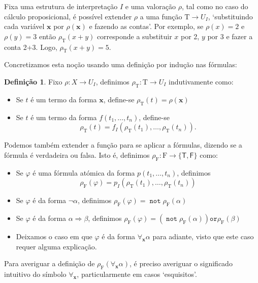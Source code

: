 \documentclass{report}
\theoremstyle{definition}
\newtheorem{definicao}{Definição}
\theoremstyle{remark}
\renewcommand{\bf}[1]{\mathbf{#1}}
\newcommand{\F}{\mathrm{F}}
\newcommand{\T}{\mathrm{T}}
\newcommand{\lt}{\mathsf{T}}
\newcommand{\lf}{\mathsf{F}}
\DeclareMathOperator{\pnot}{\texttt{not}}
\newcommand{\por}{\mathbin{\texttt{or}}}
\newcommand{\imply}{\mathbin{\Rightarrow}}
\begin{document}
	Fixa uma estrutura de interpretação $I$ e uma valoração $\rho$, tal como no caso do cálculo proposicional, é possível extender $\rho$ a uma função $\T \to U_I$, `substituindo cada variável $\bf x$ por $\rho(\bf x)$ e fazendo as contas'. Por exemplo, se $\rho(x) = 2$ e $\rho(y) = 3$ então $\rho_\T(x+y)$ corresponde a substituir $x$ por 2, $y$ por 3 e fazer a conta 2+3. Logo, $\rho_\T(x+y) = 5$.

Concretizamos esta noção usando uma definição por indução nas fórmulas:
	
	\begin{definicao}
	Fixo $\rho : X \to U_I$, definimos $\rho_\T : \T \to U_I$ indutivamente como:
	
	\begin{itemize}
	\item Se $t$ é um termo da forma $\bf x$, define-se $\rho_\T(t) = \rho(\bf x)$
	
	\item Se $t$ é um termo da forma $f(t_1, \dots, t_n)$, define-se
	\[\rho_\T(t) = f_I(\rho_\T(t_1), \dots, \rho_\T(t_n)).\]
	\end{itemize}
	
	Podemos também extender a função para se aplicar a fórmulas, dizendo se a fórmula é verdadeira ou falsa. Isto é, definimos $\rho_\F : \F \to \{\lt, \lf\}$ como:
	
	\begin{itemize}
	\item Se $\varphi$ é uma fórmula atómica da forma $p(t_1, \dots, t_n)$, definimos
	\[\rho_\F(\varphi) = p_I(\rho_\T(t_1), \dots, \rho_\T(t_n))\]
	
	\item Se $\varphi$ é da forma $\neg \alpha$, definimos $\rho_\F(\varphi) = \pnot \rho_\F(\alpha)$
	
	\item Se $\varphi$ é da forma $\alpha \imply \beta$, definimos $\rho_\F(\varphi) = (\pnot \rho_\F(\alpha)) \por \rho_\F(\beta)$
	
	\item Deixamos o caso em que $\varphi$ é da forma $\forall_{\bf x} \alpha$ para adiante, visto que este caso requer alguma explicação.
	\end{itemize}
	\end{definicao}
	
	Para averiguar a definição de $\rho_\F(\forall_{\bf x} \alpha)$, é preciso averiguar o significado intuitivo do símbolo $\forall_{\bf x}$, particularmente em casos `esquisitos'.
	
\end{document}
